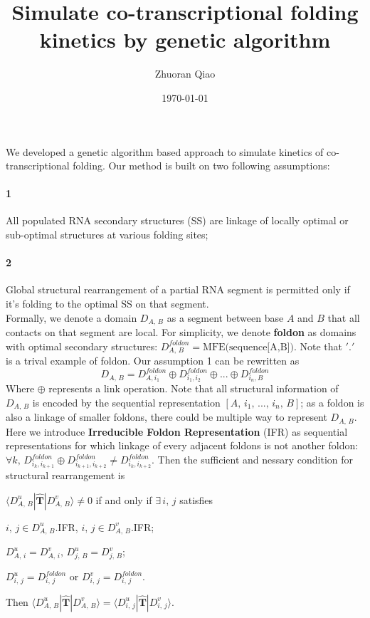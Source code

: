 \documentclass[11pt, a4paper]{article}
\begin{document}
\title{Simulate co-transcriptional folding kinetics by genetic algorithm}
\author{Zhuoran Qiao}
\date{\today}

\maketitle

We developed a genetic algorithm based approach to simulate kinetics of co-transcriptional folding. Our method is built on two following assumptions:
\paragraph{1} All populated RNA secondary structures (SS) are linkage of locally optimal or sub-optimal structures at various folding sites;
\paragraph{2} Global structural rearrangement of a partial RNA segment is permitted only if it's folding to the optimal SS on that segment.
\\

Formally, we denote a domain $D_{A,\,B}$ as a segment between base $A$ and $B$ that all contacts on that segment are local. For simplicity, we denote \textbf{foldon}
as domains with optimal secondary structures: $D^{foldon}_{A,\,B} = \text{MFE(sequence[A,B])}$. Note that $'.'$ is a trival example of foldon.
Our assumption 1 can be rewritten as
\begin{equation}
  D_{A,\,B} = D^{foldon}_{A, i_1} \oplus D^{foldon}_{i_1, i_2} \oplus ... \oplus D^{foldon}_{i_n, B}
\end{equation}
Where $\oplus$ represents a link operation. Note that all structural information of $D_{A,\,B}$ is encoded by the sequential representation $[A,\, i_1,\, ...,\, i_n,\, B]$;
 as a foldon is also a linkage of smaller foldons, there could be multiple way to represent $D_{A,\,B}$. Here we introduce \textbf{Irreducible Foldon Representation} (IFR) as
 sequential representations for which linkage of every adjacent foldons is not another foldon: $\forall k,\, D^{foldon}_{i_k, i_{k+1}} \oplus D^{foldon}_{i_{k+1}, i_{k+2}} \neq D^{foldon}_{i_{k}, i_{k+2}}$.
 Then the sufficient and nessary condition for structural rearrangement is

\begin{center}
  $\langle D^{u}_{A,\,B} | \hat{\mathbf{T}} | D^{v}_{A,\,B} \rangle \neq 0$ if and only if $\exists\, i,\,j$ satisfies

  $i,\,j \in D^{u}_{A,\,B}$.IFR, $i,\,j \in D^{v}_{A,\,B}$.IFR;

  $D^{u}_{A,\,i} = D^{v}_{A,\,i},\, D^{u}_{j,\,B} = D^{v}_{j,\,B}$;

  $D^{u}_{i,\,j} = D^{foldon}_{i,\,j}$ or $D^{v}_{i,\,j} = D^{foldon}_{i,\,j}$.

  Then $\langle D^{u}_{A,\,B} | \hat{\mathbf{T}} | D^{v}_{A,\,B} \rangle = \langle D^{u}_{i,\,j} | \hat{\mathbf{T}} | D^{v}_{i,\,j} \rangle$.
\end{center}
\end{document}
